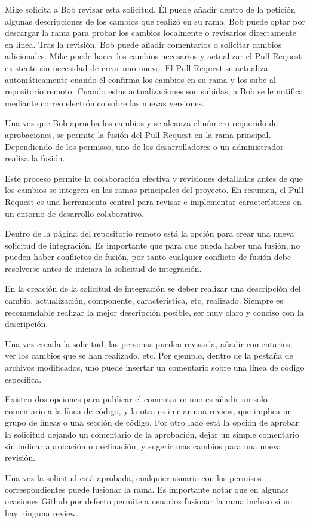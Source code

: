 Mike solicita a Bob revisar esta solicitud. Él puede añadir dentro de la petición algunas descripciones de los cambios que realizó en su rama. Bob puede optar por descargar la rama para probar los cambios localmente o revisarlos directamente en línea. Tras la revisión, Bob puede añadir comentarios o solicitar cambios adicionales. Mike puede hacer los cambios necesarios y actualizar el Pull Request existente sin necesidad de crear uno nuevo. El Pull Request se actualiza automáticamente cuando él confirma los cambios en su rama y los sube al repositorio remoto.  Cuando estas actualizaciones son subidas, a Bob se le notifica mediante correo electrónico sobre las nuevas versiones.

Una vez que Bob aprueba los cambios y se alcanza el número requerido de aprobaciones, se permite la fusión del Pull Request en la rama principal. Dependiendo de los permisos, uno de los desarrolladores o un administrador realiza la fusión.

Este proceso permite la colaboración efectiva y revisiones detalladas antes de que los cambios se integren en las ramas principales del proyecto. En resumen, el Pull Request es una herramienta central para revisar e implementar características en un entorno de desarrollo colaborativo.

Dentro de la página del repositorio remoto está la opción para crear una nueva solicitud de integración. Es importante que para que pueda haber una fusión, no pueden haber conflictos de fusión, por tanto cualquier conflicto de fusión debe resolverse antes de iniciara la solicitud de integración.

En la creación de la solicitud de integración se deber realizar una descripción del cambio, actualización, componente, característica, etc, realizado. Siempre es recomendable realizar la mejor descripción posible, ser muy claro y conciso con la descripción. 

Una vez creada la solicitud, las personas pueden revisarla, añadir comentarios, ver los cambios que se han realizado, etc. Por ejemplo, dentro de la pestaña de archivos modificados, uno puede insertar un comentario sobre una línea de código específica. 

Existen dos opciones para publicar el comentario: uno es añadir un solo comentario a la línea de código, y la otra es iniciar una review, que implica un grupo de líneas o una sección de código. Por otro lado está la opción de aprobar la solicitud dejando un comentario de la aprobación,  dejar un simple comentario sin indicar aprobación o declinación, y sugerir más cambios para una nueva revisión.

Una vez la solicitud está aprobada, cualquier usuario con los permisos correspondientes puede fusionar la rama. Es importante notar que en algunas ocasiones Github por defecto permite a usuarios fusionar la rama incluso si no hay ninguna review. 